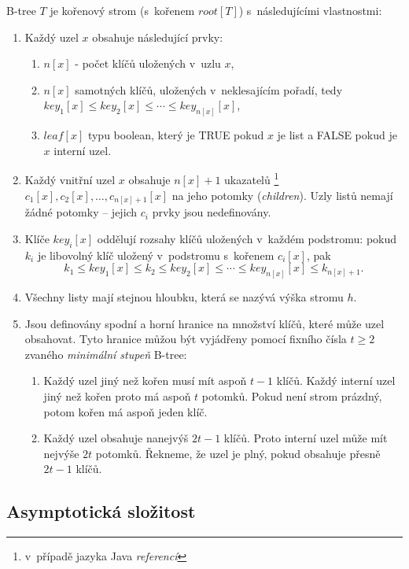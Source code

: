 B-tree $T$ je kořenový strom (s~kořenem $root[T]$) s~následujícími
vlastnostmi:
\begin{enumerate}
\item Každý uzel $x$ obsahuje následující prvky:

\begin{enumerate}
\item $n[x]$ - počet klíčů uložených v~uzlu $x$,
\item $n[x]$ samotných klíčů, uložených v~neklesajícím pořadí, tedy \linebreak $key_{1}[x]\leq key_{2}[x]\leq\cdots\leq key_{n[x]}[x]$,
\item $leaf[x]$ typu boolean, který je TRUE pokud $x$ je list a FALSE
pokud je $x$ interní uzel\@.
\end{enumerate}
\item Každý vnitřní uzel $x$ obsahuje $n[x]+1$ ukazatelů
\footnote{v~případě jazyka Java \emph{referencí}
} $c_{1}[x],c_{2}[x],\ldots{},c_{n[x]+1}[x]$ na jeho potomky (\emph{children}).
Uzly listů nemají žádné potomky -- jejich $c_{i}$ prvky jsou nedefinovány.
\item Klíče $key_{i}[x]$ oddělují rozsahy klíčů uložených v~každém podstromu:
pokud $k_{i}$ je libovolný klíč uložený v~podstromu s~kořenem $c_{i}[x]$,
pak
\[
k_{1}\leq key_{1}[x]\leq k_{2}\leq key_{2}[x]\leq\cdots\leq key_{n[x]}[x]\leq k_{n[x]+1}.
\]

\item Všechny listy mají stejnou hloubku, která se nazývá výška stromu $h$\@.
\item Jsou definovány spodní a horní hranice na množství klíčů, které může
uzel obsahovat\@. Tyto hranice můžou být vyjádřeny pomocí fixního
čísla $t\geq2$ zvaného \emph{minimální stupeň} B-tree:

\begin{enumerate}
\item Každý uzel jiný než kořen musí mít aspoň $t-1$ klíčů\@. Každý interní
uzel jiný než kořen proto má aspoň $t$ potomků\@. Pokud není strom
prázdný, potom kořen má aspoň jeden klíč\@.
\item Každý uzel obsahuje nanejvýš $2t-1$ klíčů\@. Proto interní uzel
může mít nejvýše $2t$ potomků\@. Řekneme, že uzel je plný, pokud
obsahuje přesně $2t-1$ klíčů\@.
\end{enumerate}
\end{enumerate}

\subsection{Asymptotická složitost}


